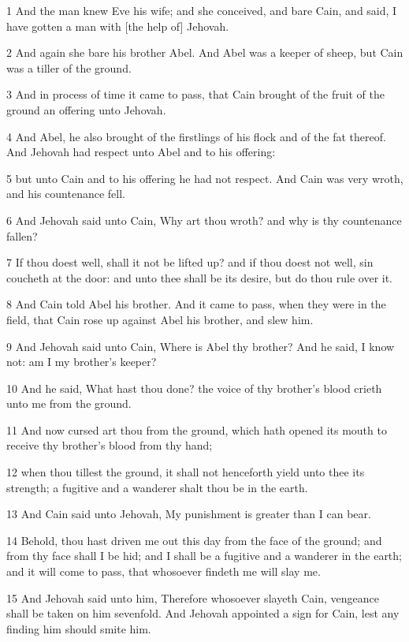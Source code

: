 \par 1 And the man knew Eve his wife; and she conceived, and bare Cain, and said, I have gotten a man with [the help of] Jehovah.
\par 2 And again she bare his brother Abel. And Abel was a keeper of sheep, but Cain was a tiller of the ground.
\par 3 And in process of time it came to pass, that Cain brought of the fruit of the ground an offering unto Jehovah.
\par 4 And Abel, he also brought of the firstlings of his flock and of the fat thereof. And Jehovah had respect unto Abel and to his offering:
\par 5 but unto Cain and to his offering he had not respect. And Cain was very wroth, and his countenance fell.
\par 6 And Jehovah said unto Cain, Why art thou wroth? and why is thy countenance fallen?
\par 7 If thou doest well, shall it not be lifted up? and if thou doest not well, sin coucheth at the door: and unto thee shall be its desire, but do thou rule over it.
\par 8 And Cain told Abel his brother. And it came to pass, when they were in the field, that Cain rose up against Abel his brother, and slew him.
\par 9 And Jehovah said unto Cain, Where is Abel thy brother? And he said, I know not: am I my brother's keeper?
\par 10 And he said, What hast thou done? the voice of thy brother's blood crieth unto me from the ground.
\par 11 And now cursed art thou from the ground, which hath opened its mouth to receive thy brother's blood from thy hand;
\par 12 when thou tillest the ground, it shall not henceforth yield unto thee its strength; a fugitive and a wanderer shalt thou be in the earth.
\par 13 And Cain said unto Jehovah, My punishment is greater than I can bear.
\par 14 Behold, thou hast driven me out this day from the face of the ground; and from thy face shall I be hid; and I shall be a fugitive and a wanderer in the earth; and it will come to pass, that whosoever findeth me will slay me.
\par 15 And Jehovah said unto him, Therefore whosoever slayeth Cain, vengeance shall be taken on him sevenfold. And Jehovah appointed a sign for Cain, lest any finding him should smite him.
